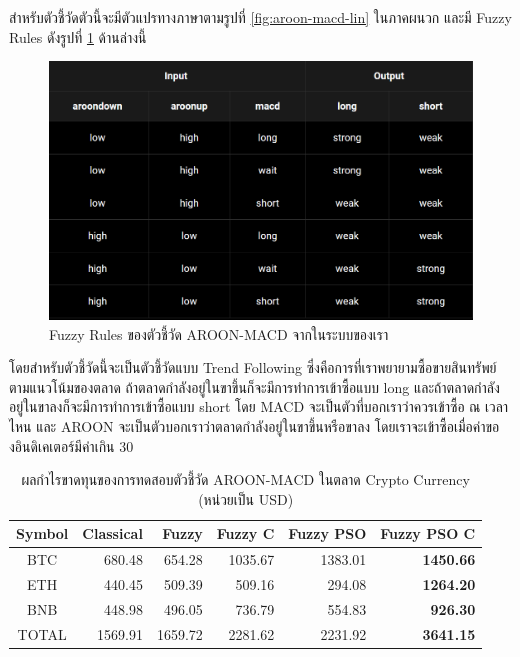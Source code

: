 สำหรับตัวชี้วัดตัวนี้จะมีตัวแปรทางภาษาตามรูปที่ \ref{fig:aroon-macd-lin} ในภาคผนวก และมี Fuzzy Rules ดังรูปที่ \ref{fig:aroon-macd-rules} ด้านล่างนี้
\begin{figure}[!ht]
    \centering
    \includegraphics[width=\textwidth]{images/aroon-macd-rules.png}
    \caption{Fuzzy Rules ของตัวชี้วัด AROON-MACD จากในระบบของเรา}
    \label{fig:aroon-macd-rules}
\end{figure}

โดยสำหรับตัวชี้วัดนี้จะเป็นตัวชี้วัดแบบ Trend Following ซึ่งคือการที่เราพยายามซื้อขายสินทรัพย์ตามแนวโน้มของตลาด ถ้าตลาดกำลังอยู่ในขาขึ้นก็จะมีการทำการเข้าซื้อแบบ long และถ้าตลาดกำลังอยู่ในขาลงก็จะมีการทำการเข้าซื้อแบบ short โดย MACD จะเป็นตัวที่บอกเราว่าควรเข้าซื้อ ณ เวลาไหน และ AROON จะเป็นตัวบอกเราว่าตลาดกำลังอยู่ในขาขึ้นหรือขาลง โดยเราจะเข้าซื้อเมื่อค่าของอินดิเคเตอร์มีค่าเกิน 30

\begin{table}[!h]
    \centering
    \begin{tabular}{crrrrr}
        \hline
        \textbf{Symbol} & \textbf{Classical} & \textbf{Fuzzy} & \textbf{Fuzzy C} & \textbf{Fuzzy PSO} & \textbf{Fuzzy PSO C} \\ \hline
        BTC             & 680.48             & 654.28         & 1035.67          & 1383.01            & \textbf{1450.66}     \\ \hline
        ETH             & 440.45             & 509.39         & 509.16           & 294.08             & \textbf{1264.20}     \\ \hline
        BNB             & 448.98             & 496.05         & 736.79           & 554.83             & \textbf{926.30}      \\ \hline
        TOTAL           & 1569.91            & 1659.72        & 2281.62          & 2231.92            & \textbf{3641.15}     \\ \hline
    \end{tabular}
    \caption{ผลกำไรขาดทุนของการทดสอบตัวชี้วัด AROON-MACD ในตลาด Crypto Currency (หน่วยเป็น USD)}
    \label{tab:aroon-macd-crypto}
\end{table}

